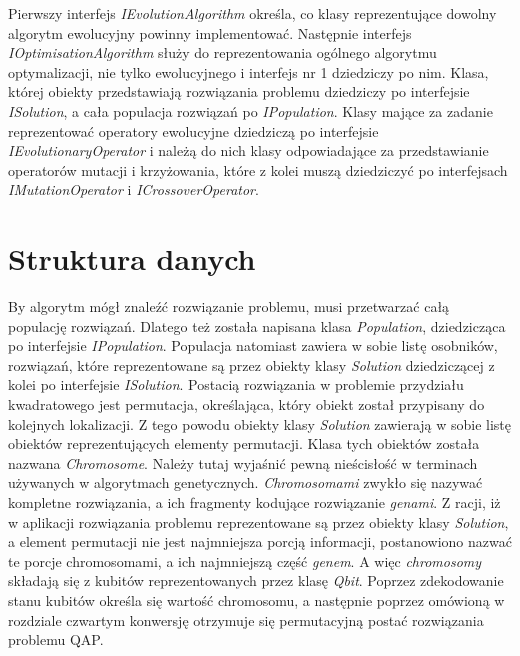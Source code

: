 Pierwszy interfejs \textit{IEvolutionAlgorithm} określa, co klasy reprezentujące dowolny algorytm ewolucyjny powinny implementować. Następnie interfejs \textit{IOptimisationAlgorithm} służy do reprezentowania ogólnego algorytmu optymalizacji, nie tylko ewolucyjnego i  interfejs nr 1 dziedziczy po nim. Klasa, której obiekty przedstawiają rozwiązania problemu dziedziczy po interfejsie \textit{ISolution}, a cała populacja rozwiązań po \textit{IPopulation}. Klasy mające za zadanie reprezentować operatory ewolucyjne dziedziczą po interfejsie \textit{IEvolutionaryOperator} i należą do nich klasy odpowiadające za przedstawianie operatorów mutacji i krzyżowania, które z kolei muszą dziedziczyć po interfejsach \textit{IMutationOperator} i \textit{ICrossoverOperator}.

\section{Struktura danych}
By algorytm mógł znaleźć rozwiązanie problemu, musi przetwarzać całą populację rozwiązań. Dlatego też została napisana klasa \textit{Population}, dziedzicząca po interfejsie \textit{IPopulation}. Populacja natomiast zawiera w sobie listę osobników, rozwiązań, które reprezentowane są przez obiekty klasy \textit{Solution} dziedziczącej z kolei po interfejsie \textit{ISolution}. Postacią rozwiązania w problemie przydziału kwadratowego jest permutacja, określająca, który obiekt został przypisany do kolejnych lokalizacji. Z tego powodu obiekty klasy \textit{Solution} zawierają w sobie listę obiektów reprezentujących elementy permutacji. Klasa tych obiektów została nazwana \textit{Chromosome}. Należy tutaj wyjaśnić pewną nieścisłość w terminach używanych w algorytmach genetycznych. \textit{Chromosomami} zwykło się nazywać kompletne rozwiązania, a ich fragmenty kodujące rozwiązanie \textit{genami}. Z racji, iż w aplikacji rozwiązania problemu reprezentowane są przez obiekty klasy \textit{Solution}, a element permutacji nie jest najmniejsza porcją informacji, postanowiono nazwać te porcje chromosomami, a ich najmniejszą część \textit{genem}. A więc \textit{chromosomy} składają się z kubitów reprezentowanych przez klasę \textit{Qbit}. Poprzez zdekodowanie stanu kubitów określa się wartość chromosomu, a następnie poprzez omówioną w rozdziale czwartym konwersję otrzymuje się permutacyjną postać rozwiązania problemu QAP.
\newpage
